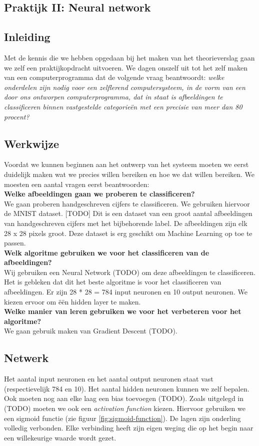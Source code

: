 \textcolor{praktijk}{
	\section{Praktijk II: Neural network}
}


\subsection{Inleiding}
Met de kennis die we hebben opgedaan bij het maken van het theorieverslag gaan we zelf een praktijkopdracht uitvoeren. We dagen onszelf uit tot het zelf maken van een computerprogramma dat de volgende vraag beantwoordt: \textit{welke onderdelen zijn nodig voor een zelflerend computersysteem, in de vorm van een door ons ontworpen computerprogramma, dat in staat is afbeeldingen te classificeren binnen vastgestelde categorie\"en met een precisie van meer dan 80 procent?}

\subsection{Werkwijze}
Voordat we kunnen beginnen aan het ontwerp van het systeem moeten we eerst duidelijk maken wat we precies willen bereiken en hoe we dat willen bereiken. We moesten een aantal vragen eerst beantwoorden:\\
\textbf{Welke afbeeldingen gaan we proberen te classificeren?}\\
We gaan proberen handgeschreven cijfers te classificeren. We gebruiken hiervoor de MNIST dataset. [TODO] Dit is een dataset van een groot aantal afbeeldingen van handgeschreven cijfers met het bijbehorende label. De afbeeldingen zijn elk 28 x 28 pixels groot. Deze dataset is erg geschikt om Machine Learning op toe te passen.\\
\textbf{Welk algoritme gebruiken we voor het classificeren van de afbeeldingen?}\\
Wij gebruiken een Neural Network (TODO) om deze afbeeldingen te classificeren. Het is gebleken dat dit het beste algoritme is voor het classificeren van afbeeldingen. Er zijn 28 * 28 = 784 input neuronen en 10 output neuronen. We kiezen ervoor om \"e\"en hidden layer te maken.\\
\textbf{Welke manier van leren gebruiken we voor het verbeteren voor het algoritme?}\\
We gaan gebruik maken van Gradient Descent (TODO).

\subsection{Netwerk}
Het aantal input neuronen en het aantal output neuronen staat vast (respectievelijk 784 en 10). Het aantal hidden neuronen kunnen we zelf bepalen. Ook moeten nog aan elke laag een bias toevoegen (TODO). Zoals uitgelegd in (TODO) moeten we ook een \textit{activation function} kiezen. Hiervoor gebruiken we een sigmoid functie (zie figuur \ref{fig:sigmoid-function}). De lagen zijn onderling volledig verbonden. Elke verbinding heeft zijn eigen weging die op het begin naar een willekeurige waarde wordt gezet.


